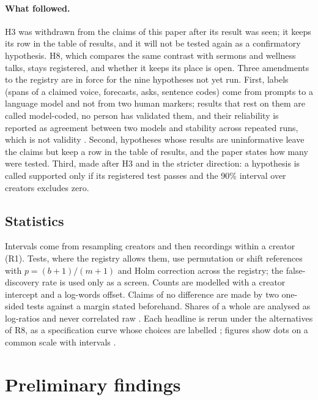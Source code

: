 \documentclass[letterpaper]{article} %
\begin{document}
\paragraph{What followed.} H3 was withdrawn from the claims of this paper after its result was seen; it keeps its row in the table of results, and it will not be tested again as a confirmatory hypothesis. H8, which compares the same contrast with sermons and wellness talks, stays registered, and whether it keeps its place is open. Three amendments to the registry are in force for the nine hypotheses not yet run. First, labels (spans of a claimed voice, forecasts, asks, sentence codes) come from prompts to a language model and not from two human markers; results that rest on them are called model-coded, no person has validated them, and their reliability is reported as agreement between two models and stability across repeated runs, which is not validity \cite{chan2021four,teblunthuis2023misclassification}. Second, hypotheses whose results are uninformative leave the claims but keep a row in the table of results, and the paper states how many were tested. Third, made after H3 and in the stricter direction: a hypothesis is called supported only if its registered test passes and the 90\% interval over creators excludes zero.

\subsection{Statistics}

Intervals come from resampling creators and then recordings within a creator (R1). Tests, where the registry allows them, use permutation or shift references with $p = (b+1)/(m+1)$ \cite{phipson2016permutation} and Holm correction across the registry; the false-discovery rate is used only as a screen. Counts are modelled with a creator intercept and a log-words offset. Claims of no difference are made by two one-sided tests against a margin stated beforehand. Shares of a whole are analysed as log-ratios and never correlated raw \cite{aitchison1982statistical,lovell2015proportionality}. Each headline is rerun under the alternatives of R8, as a specification curve whose choices are labelled \cite{simonsohn2020specification,delgiudice2021traveler,linde2026making}; figures show dots on a common scale with intervals \cite{cleveland1984graphical}.

\section{Preliminary findings}
\label{sec:findings}
\end{document}
